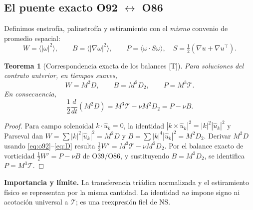 \documentclass[11pt,a4paper]{article}
\newtheorem{teo}{Teorema}[section]
\theoremstyle{definition}\newtheorem{defi}[teo]{Definición}
\newcommand{\mean}[1]{\langle #1\rangle}\newcommand{\pplus}[1]{\left[#1\right]_+}
\newcommand{\stat}[1]{\textcolor{blue!50!black}{\textsf{[#1]}}}
\begin{document}
\subsection{El puente exacto O92 $\leftrightarrow$ O86}
Definimos enstrofía, palinstrofía y estiramiento con el \emph{mismo} convenio de promedio espacial:
\begin{equation}
W=\mean{|\omega|^2},\qquad B=\mean{|\nabla\omega|^2},\qquad
P=\mean{\omega\cdot S\omega},\quad S=\tfrac12(\nabla u+\nabla u^\top).
\end{equation}
\begin{teo}[Correspondencia exacta de los balances \stat{T}]\label{th:puente}
Para soluciones del contrato anterior, en tiempos suaves,
\begin{equation}\label{eq:puente}
\boxed{W=M^2D,\qquad B=M^2D_2,\qquad P=M^3\mathcal T.}
\end{equation}
En consecuencia,
\begin{equation}\label{eq:balance}
\boxed{\frac12\frac{d}{dt}(M^2D)=M^3\mathcal T-\nu M^2D_2=P-\nu B.}
\end{equation}
\end{teo}
\begin{proof}
Para campo solenoidal $k\cdot\widehat u_k=0$, la identidad $|k\times\widehat u_k|^2=|k|^2|\widehat u_k|^2$ y Parseval dan $W=\sum|k|^2|\widehat u_k|^2=M^2D$ y $B=\sum|k|^4|\widehat u_k|^2=M^2D_2$. Derivar $M^2D$ usando \eqref{eq:o92}--\eqref{eq:D} resulta $\frac12W'=M^3\mathcal T-\nu M^2D_2$. Por el balance exacto de vorticidad $\frac12W'=P-\nu B$ de O39/O86, y sustituyendo $B=M^2D_2$, se identifica $P=M^3\mathcal T$.
\end{proof}
\noindent\textbf{Importancia y límite.} La transferencia triádica normalizada y el estiramiento físico se representan por la misma cantidad. La identidad \emph{no} impone signo ni acotación universal a $\mathcal T$; es una reexpresión fiel de NS.
\end{document}
